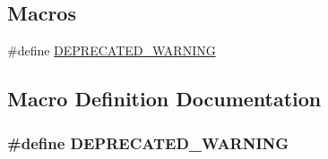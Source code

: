 \subsection*{Macros}
\begin{DoxyCompactItemize}
\item 
\#define \hyperlink{_kameleon-_tracer_8cpp_a16898f1c70c7feb219aef05e3351a9b5}{D\-E\-P\-R\-E\-C\-A\-T\-E\-D\-\_\-\-W\-A\-R\-N\-I\-N\-G}
\end{DoxyCompactItemize}


\subsection{Macro Definition Documentation}
\hypertarget{_kameleon-_tracer_8cpp_a16898f1c70c7feb219aef05e3351a9b5}{
\subsubsection[{D\-E\-P\-R\-E\-C\-A\-T\-E\-D\-\_\-\-W\-A\-R\-N\-I\-N\-G}]{\setlength{\rightskip}{0pt plus 5cm}\#define D\-E\-P\-R\-E\-C\-A\-T\-E\-D\-\_\-\-W\-A\-R\-N\-I\-N\-G}}\label{_kameleon-_tracer_8cpp_a16898f1c70c7feb219aef05e3351a9b5}
